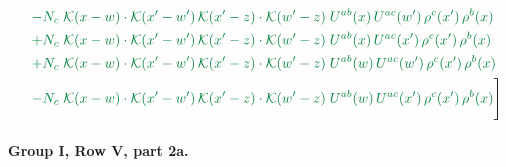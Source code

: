 \documentclass[10pt]{article}
\numberwithin{equation}{section}
\begin{document}
\begin{align}
&\quad{\color{JIM}-N_c\;\mathcal{K}(x-w)\cdot\mathcal{K}(x'-w')\,\mathcal{K}(x'-z)\cdot\mathcal{K}(w'-z)\;U^{ab}(x)\,U^{ac}(w')\,\rho^{c}(x')\,\rho^{b}(x)}\notag\\
&\quad{\color{JIM}+N_c\;\mathcal{K}(x-w)\cdot\mathcal{K}(x'-w')\,\mathcal{K}(x'-z)\cdot\mathcal{K}(w'-z)\;U^{ab}(x)\,U^{ac}(x')\,\rho^{c}(x')\,\rho^{b}(x)}\notag\\
&\quad{\color{JIM}+N_c\;\mathcal{K}(x-w)\cdot\mathcal{K}(x'-w')\,\mathcal{K}(x'-z)\cdot\mathcal{K}(w'-z)\;U^{ab}(w)\,U^{ac}(w')\,\rho^{c}(x')\,\rho^{b}(x)}\notag\\
&\quad{\color{JIM}-N_c\;\mathcal{K}(x-w)\cdot\mathcal{K}(x'-w')\,\mathcal{K}(x'-z)\cdot\mathcal{K}(w'-z)\;U^{ab}(w)\,U^{ac}(x')\,\rho^{c}(x')\,\rho^{b}(x)}\Bigg]\label{eq:gen0}
\end{align}
\paragraph{Group I, Row V, part 2a.}
\end{document}
